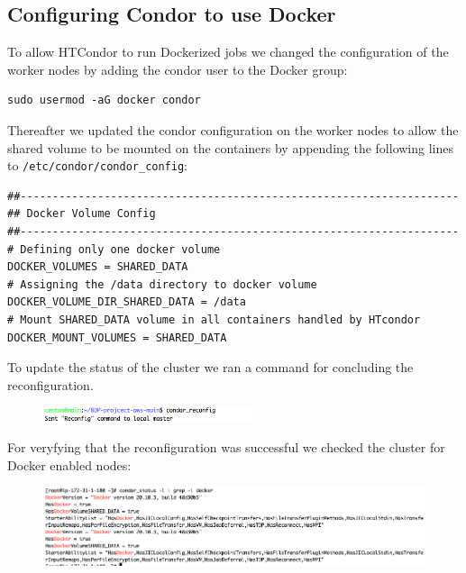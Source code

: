 \documentclass{article}
\begin{document}
\subsection{Configuring Condor to use Docker}
To allow HTCondor to run Dockerized jobs we changed the configuration of the worker nodes by adding the condor user to the Docker group:
\begin{lstlisting}
sudo usermod -aG docker condor
\end{lstlisting}
Thereafter we updated the condor configuration on the worker nodes to allow the shared volume to be mounted on the containers by appending the following lines to \texttt{/etc/condor/condor\_config}:
\begin{lstlisting}
##--------------------------------------------------------------------
## Docker Volume Config
##--------------------------------------------------------------------
# Defining only one docker volume
DOCKER_VOLUMES = SHARED_DATA
# Assigning the /data directory to docker volume
DOCKER_VOLUME_DIR_SHARED_DATA = /data
# Mount SHARED_DATA volume in all containers handled by HTcondor
DOCKER_MOUNT_VOLUMES = SHARED_DATA
\end{lstlisting}

To update the status of the cluster we ran a command for concluding the reconfiguration.
\begin{figure}[!h]
    \includegraphics[width=0.55\textwidth]{img/condor_reconfig.png}
\end{figure}
\FloatBarrier

For veryfying that the reconfiguration was successful  we checked the cluster for Docker enabled nodes:
\begin{figure}[!h]
    \includegraphics[width=\textwidth]{img/condor_status_grep_i_docker.png}
\end{figure}



\end{document}
